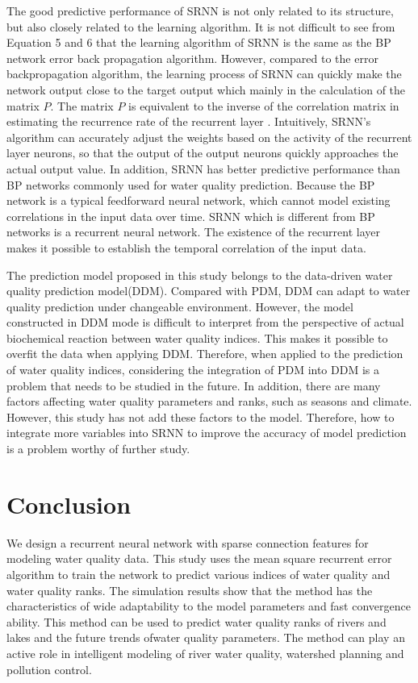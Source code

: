 \documentclass[runningheads]{llncs}
\begin{document}
The good predictive performance of SRNN is not only related to 
its structure, but also closely related to the learning algorithm.
It is not difficult to see from Equation 5 and 6 that the 
learning algorithm of SRNN is the same as the BP network error 
back propagation algorithm. However, compared to the error 
backpropagation algorithm, the learning process of SRNN can 
quickly make the network output close to the target output 
which mainly in the calculation of the matrix $P$. The matrix $P$ 
is equivalent to the inverse of the correlation matrix in 
estimating the recurrence rate of the recurrent layer \cite{RN23}. 
Intuitively, SRNN's algorithm can accurately adjust the weights based on the activity 
of the recurrent layer neurons, so that the output of the 
output neurons quickly approaches the actual output value. 
In addition, SRNN has better predictive performance than BP 
networks commonly used for water quality prediction. Because 
the BP network is a typical feedforward neural network, which 
cannot model existing correlations in the input data 
over time. SRNN which is different from BP networks is a recurrent neural 
network. The existence of the recurrent layer makes it possible 
to establish the temporal correlation of the input data. 

The prediction model proposed in this study belongs to the 
data-driven water quality prediction model(DDM). Compared with
PDM, DDM can adapt to water quality prediction under changeable 
environment. However, the model constructed in DDM mode is 
difficult to interpret from the perspective of actual biochemical 
reaction between water quality indices. This makes it possible
to overfit the data when applying DDM. Therefore, when applied to 
the prediction of water quality indices, considering the integration 
of PDM into DDM is a problem that needs to be studied in the future.
In addition, there are many factors affecting water quality parameters 
and ranks, such as seasons and climate. However, this study has not add 
these factors to the model. Therefore, how to integrate more variables 
into SRNN to improve the accuracy of model prediction is a problem 
worthy of further study.  

\section{Conclusion}
We design a recurrent neural network with sparse
connection features for modeling water quality data. 
This study uses the mean square recurrent error algorithm 
to train the network to predict various indices of water 
quality and water quality ranks. The simulation results 
show that the method has the characteristics of wide 
adaptability to the model parameters and fast convergence ability.
This method can be used to predict water quality ranks of 
rivers and lakes and the future trends ofwater quality parameters. 
The method can play an active role 
in intelligent modeling of river water quality, 
watershed planning and pollution control.
%
%
%
 
 
\end{document}

